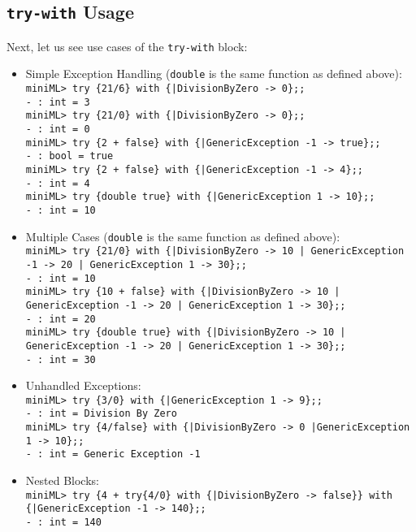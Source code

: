 \documentclass{article}
\begin{document}
    \subsection{\texttt{try-with} Usage}
    Next, let us see use cases of the \texttt{try-with} block:
    \begin{itemize}
        \item Simple Exception Handling (\texttt{double} is the same function as defined above):\\\texttt{miniML> try \{21/6\} with \{|DivisionByZero -> 0\};;\\- : int = 3\\miniML> try \{21/0\} with \{|DivisionByZero -> 0\};;\\- : int = 0\\miniML> try \{2 + false\} with \{|GenericException -1 -> true\};;\\- : bool = true\\miniML> try \{2 + false\} with \{|GenericException -1 -> 4\};;\\- : int = 4\\miniML> try \{double true\} with \{|GenericException 1 -> 10\};;\\- : int = 10}
        \item Multiple Cases (\texttt{double} is the same function as defined above):\\\texttt{miniML> try \{21/0\} with \{|DivisionByZero -> 10 | GenericException -1 -> 20 | GenericException 1 -> 30\};;\\- : int = 10\\miniML> try \{10 + false\} with \{|DivisionByZero -> 10 | GenericException -1 -> 20 | GenericException 1 -> 30\};;\\- : int = 20\\miniML> try \{double true\} with \{|DivisionByZero -> 10 | GenericException -1 -> 20 | GenericException 1 -> 30\};;\\- : int = 30}
        \item Unhandled Exceptions: \\\texttt{miniML> try \{3/0\} with \{|GenericException 1 -> 9\};;\\- : int = Division By Zero\\miniML> try \{4/false\} with \{|DivisionByZero -> 0 |GenericException 1 -> 10\};;\\- : int = Generic Exception -1}
        \item Nested Blocks:\\\texttt{miniML> try \{4 + try\{4/0\} with \{|DivisionByZero -> false\}\} with \{|GenericException -1 -> 140\};;\\- : int = 140}
    \end{itemize}
\end{document}
